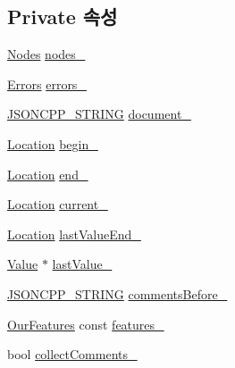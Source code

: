 \subsection*{Private 속성}
\begin{DoxyCompactItemize}
\item 
\hyperlink{class_json_1_1_our_reader_a8480a5ef159cee3a090f96358414d8d3}{Nodes} \hyperlink{class_json_1_1_our_reader_a19cc4e8c5d17ee6822f752e9a36f4ce3}{nodes\+\_\+}
\item 
\hyperlink{class_json_1_1_our_reader_a8cc69593ef7303e58e99bb5dbb767562}{Errors} \hyperlink{class_json_1_1_our_reader_afb76b68ba1ab68fe09cf2838e3d4898d}{errors\+\_\+}
\item 
\hyperlink{json_8h_a1e723f95759de062585bc4a8fd3fa4be}{J\+S\+O\+N\+C\+P\+P\+\_\+\+S\+T\+R\+I\+NG} \hyperlink{class_json_1_1_our_reader_a726230af83d22d25e0c76cec3408ecf1}{document\+\_\+}
\item 
\hyperlink{class_json_1_1_our_reader_a1bdc7bbc52ba87cae6b19746f2ee0189}{Location} \hyperlink{class_json_1_1_our_reader_a9bda9d72335d52cd06e65f9eca3f70f5}{begin\+\_\+}
\item 
\hyperlink{class_json_1_1_our_reader_a1bdc7bbc52ba87cae6b19746f2ee0189}{Location} \hyperlink{class_json_1_1_our_reader_ab1f69b0260c27a0d2d65dc56e42c8f9d}{end\+\_\+}
\item 
\hyperlink{class_json_1_1_our_reader_a1bdc7bbc52ba87cae6b19746f2ee0189}{Location} \hyperlink{class_json_1_1_our_reader_a5211fbbba94be80a22dd2317c621efcc}{current\+\_\+}
\item 
\hyperlink{class_json_1_1_our_reader_a1bdc7bbc52ba87cae6b19746f2ee0189}{Location} \hyperlink{class_json_1_1_our_reader_a101eadc45e01c60628b53f0db3d13482}{last\+Value\+End\+\_\+}
\item 
\hyperlink{class_json_1_1_value}{Value} $\ast$ \hyperlink{class_json_1_1_our_reader_a9f994b6a2227c5d96e6ed6cbc74ed251}{last\+Value\+\_\+}
\item 
\hyperlink{json_8h_a1e723f95759de062585bc4a8fd3fa4be}{J\+S\+O\+N\+C\+P\+P\+\_\+\+S\+T\+R\+I\+NG} \hyperlink{class_json_1_1_our_reader_a9c53e77e290eb9081298210a955fda6a}{comments\+Before\+\_\+}
\item 
\hyperlink{class_json_1_1_our_features}{Our\+Features} const \hyperlink{class_json_1_1_our_reader_a2714302d5cc54ca2ce4118ea51c0397a}{features\+\_\+}
\item 
bool \hyperlink{class_json_1_1_our_reader_a259f6ac988da2894bcafc670e42f73ad}{collect\+Comments\+\_\+}
\end{DoxyCompactItemize}


